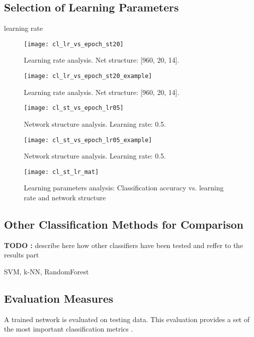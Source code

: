 \subsection{Selection of Learning Parameters} \label{ssec:selection_of_learning_parameters}

learning rate

\begin{figure}[H]
  \centering
  \texttt{[image: cl\_lr\_vs\_epoch\_st20]}
  \caption{Learning rate analysis. Net structure: [960, 20, 14].}
  \label{fig:lr_analysis}
\end{figure}

\begin{figure}[H]
  \centering
  \texttt{[image: cl\_lr\_vs\_epoch\_st20\_example]}
  \caption{Learning rate analysis. Net structure: [960, 20, 14].}
  \label{fig:lr_analysis_example}
\end{figure}

\begin{figure}[H]
  \centering
  \texttt{[image: cl\_st\_vs\_epoch\_lr05]}
  \caption{Network structure analysis. Learning rate: 0.5.}
  \label{fig:st_analysis}
\end{figure}

\begin{figure}[H]
  \centering
  \texttt{[image: cl\_st\_vs\_epoch\_lr05\_example]}
  \caption{Network structure analysis. Learning rate: 0.5.}
  \label{fig:st_analysis_example}
\end{figure}

\begin{figure}[H]
  \centering
  \texttt{[image: cl\_st\_lr\_mat]}
  \caption{Learning parameters analysis: Classification accuracy vs. learning rate and network structure}
  \label{fig:acc_st_lr_mat}
\end{figure}

\subsection{Other Classification Methods for Comparison} \label{ssec:other_classifiers}
\textbf{TODO :} describe here how other classifiers have been tested and reffer to the results part

SVM, k-NN, RandomForest

\subsection{Evaluation Measures} \label{ssec:evaluation_measures}
A trained network is evaluated on testing data. This evaluation provides a set of the most important classification metrics \citep{article:scikit-learn}.

